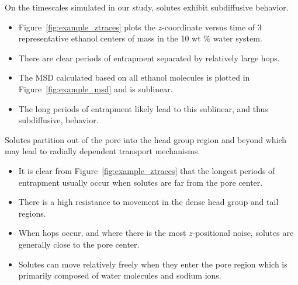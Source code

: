 \documentclass{article}
\begin{document}
  \noindent On the timescales simulated in our study, solutes exhibit subdiffusive behavior.
  \begin{itemize}  
    \item Figure~\ref{fig:example_ztraces} plots the $z$-coordinate versus time of
  	3 representative ethanol centers of mass in the 10 wt \% water system.
  	\item There are clear periods of entrapment separated by relatively large hops.
	\item The MSD calculated based on all ethanol molecules is plotted in 
	Figure~\ref{fig:example_msd} and is sublinear.
	\item The long periods of entrapment likely lead to this sublinear, and thus
	subdiffusive, behavior.
  \end{itemize}
  
  \noindent Solutes partition out of the pore into the head group region and beyond which
  may lead to radially dependent transport mechanisms.
  \begin{itemize}
    \item It is clear from Figure~\ref{fig:example_ztraces} that the longest 
    periods of entrapment usually occur when solutes are far from the pore
    center.
    \item There is a high resistance to movement in the dense head group and
    tail regions.
    \item When hops occur, and where there is the most $z$-positional noise, 
    solutes are generally close to the pore center.
    \item Solutes can move relatively freely when they enter the pore region
    which is primarily composed of water molecules and sodium ions.
  \end{itemize}
  
\end{document}
